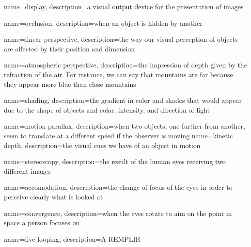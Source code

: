 {
  name=display,
  description={a visual output device for the presentation of images \cite{pimenta2012comprehensive}}
}

{
	name=occlusion,
	description={when an object is hidden by another}
}

{
	name={linear perspective},
	description={the way our visual perception of objects are affected by their position and dimension}
}

{
	name={atmospheric perspective},
	description={the impression of depth given by the refraction of the air. For instance, we can say that mountains are far because they appear more blue than close mountains}
}	

{
	name=shading,
	description={the gradient in color and shades that would appear due to the shape of objects and color, intensity, and direction of light}
}

{
	name={motion parallax},
	description={when two objects, one further from another, seem to translate at a different speed if the observer is moving}
}
{
	name={kinetic depth},
	description={the visual cues we have of an object in motion}
}

{
	name=stereoscopy,
	description={the result of the human eyes receiving two different images}
}

{
	name=accomodation,
	description={the change of focus of the eyes in order to perceive clearly what is looked at}
}

{
	name=convergence,
	description={when the eyes rotate to aim on the point in space a person focuses on}
}


{
	name={live looping},
	description={A REMPLIR}
}